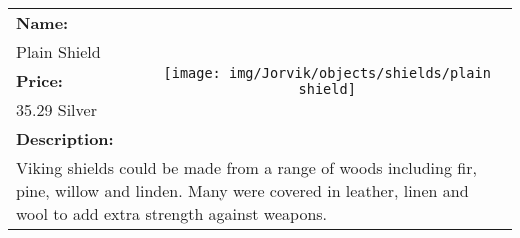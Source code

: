 \begin{table}[ht!]
	\centering
	\begin{tabular}{ p{3cm} c }\toprule
		\textbf{Name:} & \multirow{5}{*}{\texttt{[image: img/Jorvik/objects/shields/plain shield]}}\\
		Plain Shield & \\ 
		\textbf{Price:} & \\
		35.29 Silver & \\ 
		\textbf{Description:} & \\
		\multicolumn{2}{p{12cm}}{Viking shields could be made from a range of woods including fir, pine, willow and linden. Many were covered in leather, linen and wool to add extra strength against weapons.}\\
		\bottomrule
	\end{tabular}
\end{table}